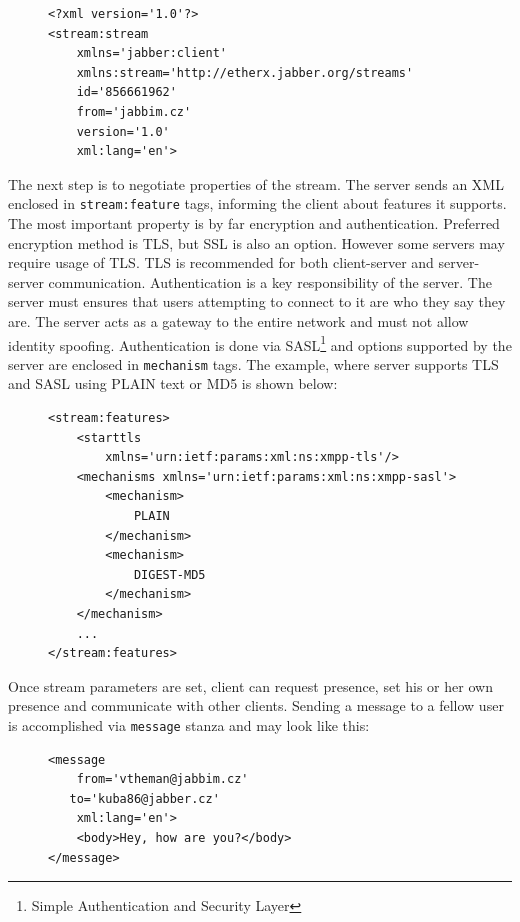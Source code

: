 \begin{figure}[h]
\begin{lstlisting}
<?xml version='1.0'?>
<stream:stream 
	xmlns='jabber:client' 
	xmlns:stream='http://etherx.jabber.org/streams' 
	id='856661962' 
	from='jabbim.cz' 
	version='1.0' 
	xml:lang='en'>
\end{lstlisting}
\end{figure}

The next step is to negotiate properties of the stream. The server sends an XML enclosed in \verb|stream:feature| tags, informing the client about features it supports. The most important property is by far encryption and authentication. Preferred encryption method is TLS, but SSL is also an option. However some servers may require usage of TLS. TLS is recommended for both client-server and server-server communication. Authentication is a key responsibility of the server. The server must ensures that users attempting to connect to it are who they say they are. The server acts as a gateway to the entire network and must not allow identity spoofing. Authentication is done via SASL\footnote{Simple Authentication and Security Layer} and options supported by the server are enclosed in \verb|mechanism| tags. The example, where server supports TLS and SASL using PLAIN text or MD5 is shown below:   

\begin{figure}[h]
\begin{lstlisting}
<stream:features>
	<starttls 
		xmlns='urn:ietf:params:xml:ns:xmpp-tls'/>
	<mechanisms xmlns='urn:ietf:params:xml:ns:xmpp-sasl'>
		<mechanism>
			PLAIN
		</mechanism>
		<mechanism>
			DIGEST-MD5
		</mechanism>
	</mechanism>
	...
</stream:features>
\end{lstlisting}
\end{figure}

Once stream parameters are set, client can request presence, set his or her own presence and communicate with other clients. Sending a message to a fellow user is accomplished via \verb|message| stanza and may look like this:

\begin{figure}[h]
\begin{lstlisting}
<message 
	from='vtheman@jabbim.cz'
   to='kuba86@jabber.cz'
	xml:lang='en'>
	<body>Hey, how are you?</body>
</message>
\end{lstlisting}
\end{figure}

